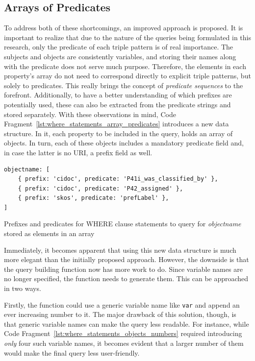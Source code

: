 \subsection{Arrays of Predicates}

To address both of these shortcomings, an improved approach is proposed. It is important to realize that due to the nature of the queries being formulated in this research, only the predicate of each triple pattern is of real importance. The subjects and objects are consistently variables, and storing their names along with the predicate does not serve much purpose. Therefore, the elements in each property's array do not need to correspond directly to explicit triple patterns, but solely to predicates. This really brings the concept of \textit{predicate sequences} to the forefront. Additionally, to have a better understanding of which prefixes are potentially used, these can also be extracted from the predicate strings and stored separately. With these observations in mind, Code Fragment~\ref{lst:where_statements_array_predicates} introduces a new data structure. In it, each property to be included in the query, holds an array of objects. In turn, each of these objects includes a mandatory predicate field and, in case the latter is no URI, a prefix field as well.

\begin{listing}[htbp]
    \begin{verbatim}
objectname: [
    { prefix: 'cidoc', predicate: 'P41i_was_classified_by' },
    { prefix: 'cidoc', predicate: 'P42_assigned' },
    { prefix: 'skos', predicate: 'prefLabel' },
]
    \end{verbatim}
    \caption{Prefixes and predicates for WHERE clause statements to query for \textit{objectname} stored as elements in an array}
    \label{lst:where_statements_array_predicates}
\end{listing}

Immediately, it becomes apparent that using this new data structure is much more elegant than the initially proposed approach. However, the downside is that the query building function now has more work to do. Since variable names are no longer specified, the function needs to generate them. This can be approached in two ways.

Firstly, the function could use a generic variable name like \texttt{var} and append an ever increasing number to it. The major drawback of this solution, though, is that generic variable names can make the query less readable. For instance, while Code Fragment~\ref{lst:where_statements_objects_numbers} required introducing \textit{only} four such variable names, it becomes evident that a larger number of them would make the final query less user-friendly.

